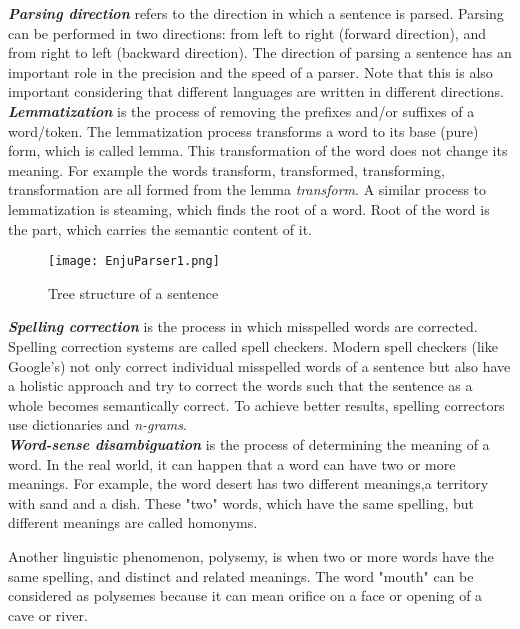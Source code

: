 \emph{ \textbf{Parsing direction}} refers to the direction in which a sentence is parsed. Parsing can be performed in two directions: from left to right (forward direction), and from right to left (backward direction). The direction of parsing a sentence has an important role in the precision and the speed of a parser. Note that this is also important considering that different languages are written in different directions.\\

\emph{\textbf{Lemmatization}} is the process of removing the prefixes and/or suffixes of a word/token. The lemmatization process transforms a word to its base (pure) form, which is called lemma. This transformation of the word does not change its meaning. For example the words transform, transformed, transforming, transformation are all formed from the lemma \emph{transform}. A similar process to lemmatization is steaming, which finds the root of a word. Root of the word is the part, which carries the semantic content of it.\\ %

\begin{figure}[ht]
   \begin{center}
	 \texttt{[image: EnjuParser1.png]}
 	 \caption[Tree structure of a sentence]{Tree structure of a sentence}
	 \label{Figure 3}
   \end{center}
\end{figure}

\emph{\textbf{Spelling correction}} is the process in which misspelled words are corrected. Spelling correction systems are called spell checkers. Modern spell checkers (like Google's) not only correct individual misspelled words of a sentence but also have a holistic approach and try to correct the words such that the sentence as a whole becomes semantically correct. To achieve better results, spelling correctors use dictionaries and \emph{n-grams}.\\

\emph{\textbf{Word-sense disambiguation}} is the process of determining the meaning of a word. In the real world, it can happen that a word can have two or more meanings. For example, the word desert has two different meanings,a territory with sand and a dish. These "two" words, which have the same spelling, but different meanings are called homonyms.

Another linguistic phenomenon, polysemy, is when two or more words have the same spelling, and distinct and related meanings. The word "mouth" can be considered as polysemes because it can mean orifice on a face or opening of a cave or river.

